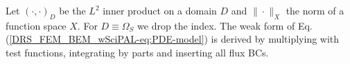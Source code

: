 \documentclass[runningheads]{lncse}
\begin{document}
Let $(\cdot, \cdot)_D$ be the $L^2$ inner product on a domain $D$ and $\| \cdot \|_X$ the norm of a function space $X$.
%
For $D \equiv \Omega_S$ we drop the index.
%
The weak 
form of Eq.(\ref{DRS_FEM_BEM_wSciPAL-eq:PDE-model}) is derived 
by multiplying with test functions, integrating by parts and inserting all flux BCs.
%
%
%
\end{document}
